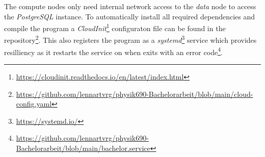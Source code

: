 		The compute nodes only need internal network access to the \emph{data} node to access the \emph{PostgreSQL} instance. To automatically install all required dependencies and compile the program a \emph{CloudInit}\footnote{\url{https://cloudinit.readthedocs.io/en/latest/index.html}} configuraton file can be found in the repository\footnote{\url{https://github.com/lennartvrg/physik690-Bachelorarbeit/blob/main/cloud-config.yaml}}. This also registers the program as a \emph{systemd}\footnote{\url{https://systemd.io/}} service which provides resilliency as it restarts the service on when exits with an error code\footnote{\url{https://github.com/lennartvrg/physik690-Bachelorarbeit/blob/main/bachelor.service}}.
